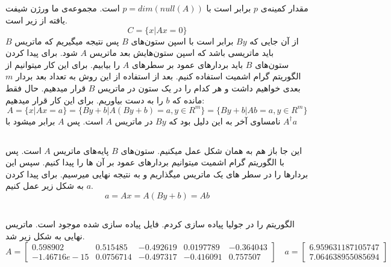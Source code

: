 \documentclass[a4paper]{article}
\begin{document}
\subsection{}
مقدار کمینه‌ی $ p $ برابر است با 
$ p = dim(null(A)) $
است. مجموعه‌ی ما ورژن شیفت یافته از 
زیر است. 
\begin{equation*}
	C =  \{x | Ax = 0 \}
\end{equation*}
از آن جایی که 
$ By $ 
برابر است با اسپن ستون‌های $ B $ پس نتیجه میگیریم که ماتریس $ B $ باید ماتریسی باشد که اسپن ستون‌هایش بعد 
ماتریس $ A $ شود. 
برای پیدا کردن ستون‌های $ B $ باید بردارهای عمود بر سطرهای $ A $ را بیابیم. برای این کار میتوانیم از الگوریتم گرام اشمیت استفاده کنیم. بعد از استفاده از این روش به تعداد بعد 
بردار $ m $ بعدی خواهیم داشت و هر کدام را در یک ستون در ماتریس $ B $ قرار میدهیم. حال فقط مانده که $ b $ را به دست بیاوریم. برای این کار قرار میدهیم:
\begin{equation*}
	A =  \{x | Ax = a \} = \{By+b | A(By+b) = a , y \in R^{m}\} = \{By+b | Ab = a, y \in R^{m}\}
\end{equation*}
نامساوی آخر به این دلیل بود که $ By $ در 
ماتریس  $ A $ است. 
پس $ A $ برابر میشود با 
$ A^{\dagger}a $
\subsection{}
این جا باز هم به همان شکل عمل میکنیم. ستون‌های $ B $ پایه‌های 
ماتریس $ A $ است. پس با الگوریتم گرام اشمیت  میتوانیم بردارهای عمود بر آن ها را پیدا کنیم. سپس این بردارها را در سطر های یک ماتریس میگذاریم و به نتیجه نهایی میرسیم. برای پیدا کردن $ a $ به شکل زیر عمل کنیم. 
\begin{equation*}
	a = Ax = A(By+b) = Ab
\end{equation*}
\subsection{}
الگوریتم 
را در جولیا پیاده سازی کردم. فایل پیاده سازی شده موجود است. ماتریس نهایی به شکل زیر شد. 
\begin{equation*}
	A = \begin{bmatrix}
		 0.598902  &   0.515485  & -0.492619 &  0.0197789 & -0.364043 \\
		-1.46716e-15 & 0.0756714 & -0.497317 & -0.416091  &  0.757507
	\end{bmatrix}
	\quad
	a = \begin{bmatrix}
		6.959631187105747 \\
		7.064638955085694
	\end{bmatrix}
\end{equation*}
\end{document}
